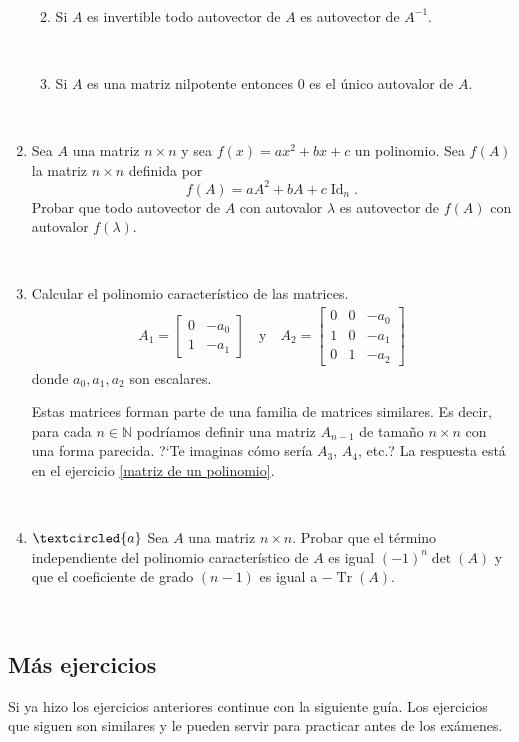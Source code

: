 \documentclass[12pt]{amsart}
\begin{document}
\begin{enumerate}
\begin{enumerate}
\

\item  Si $A$ es invertible todo autovector de $A$ es autovector de $A^{-1}$.

\

\item Si $A$ es una matriz nilpotente entonces $0$ es el \' unico autovalor de $A$.
\end{enumerate}

\

\item Sea $A$ una matriz $n\times n$ y sea $f(x) = ax^2+bx+c$ un polinomio. Sea $f(A)$ la matriz $n \times n$ definida por
$$f(A) = a A^2+bA+c\operatorname{Id}_n.$$
Probar que todo autovector de $A$ con autovalor $\lambda$ es autovector de $f(A)$ con autovalor $f(\lambda)$.

\

\item  Calcular el polinomio caracter\'istico de las matrices.
\begin{align*}
A_1=\begin{bmatrix} 0 & -a_0 \\ 1 & -a_1 
\end{bmatrix}\quad\mbox{y}\quad
A_2=\begin{bmatrix} 0 & 0 & -a_0 \\ 1 & 0 & -a_1 \\ 0 & 1 & -a_2 
\end{bmatrix}
\end{align*}
donde $a_0, a_1, a_2$ son escalares.


Estas matrices forman parte de una familia de matrices similares. Es decir, para cada $n\in\mathbb{N}$ podr\'iamos definir una matriz $A_{n-1}$ de tama\~no $n\times n$ con una forma parecida. ?`Te imaginas c\'omo ser\'ia $A_3$, $A_4$, etc.? La respuesta est\'a en el ejercicio \eqref{matriz de un polinomio}.




\

\item\label{tr det}$\textcircled{a}$ Sea $A$ una matriz $n \times n$. Probar que el t\'ermino independiente del		polinomio caracter\'istico de $A$ es igual $(-1)^n\det(A)$ y que el coeficiente de grado $(n-1)$ es igual a $-\operatorname{Tr}(A)$.



	\end{enumerate}

\

\subsection*{M\'as ejercicios}
Si ya hizo los ejercicios anteriores continue con la siguiente gu\'ia. Los ejercicios que siguen son similares y le pueden servir para practicar antes de los ex\'amenes.
\end{document}
